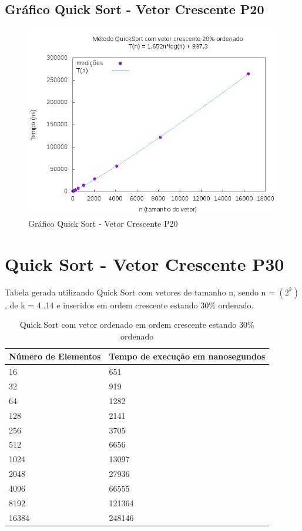 \documentclass[12pt,a4paper,twoside]{report}
\begin{document}
\subsection{Gráfico Quick Sort - Vetor Crescente P20}
\begin{figure}[H]
    \centering
    \includegraphics[width=0.7\linewidth]{graficos/QuickSort/vIntCrescenteP20/vIntCrescenteP20.png}
  \caption{Gráfico Quick Sort - Vetor Crescente P20}
\end{figure}

\section{Quick Sort - Vetor Crescente P30}
Tabela gerada utilizando Quick Sort com vetores de tamanho n, sendo n = $(2^k)$, de k = 4..14 e inseridos em ordem crescente estando 30\% ordenado.
\begin{table}[H]
\centering
\caption{Quick Sort com vetor ordenado em ordem crescente estando 30\% ordenado}
\label{my-label}
\begin{tabular}{|l|l|}
\hline
\multicolumn{1}{|c|}{\textbf{Número de Elementos}} & \multicolumn{1}{c|}{\textbf{Tempo de execução em nanosegundos}} \\ \hline
16 & 651 \\ \hline
32 & 919 \\ \hline
64 & 1282 \\ \hline
128 & 2141 \\ \hline
256 & 3705 \\ \hline
512 & 6656 \\ \hline
1024 & 13097 \\ \hline
2048 & 27936 \\ \hline
4096 & 66555 \\ \hline
8192 & 121364 \\ \hline
16384 & 248146 \\ \hline
\end{tabular}
\end{table}
\end{document}
